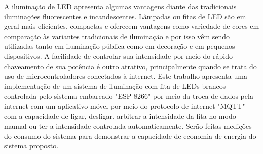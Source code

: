 

A iluminação de LED apresenta algumas vantagens diante das tradicionais iluminações fluorescentes e incandescentes. Lâmpadas ou fitas de LED são em geral mais eficientes, compactas e oferecem vantagens como variedade de cores em comparação às variantes tradicionais de iluminação e por isso vêm sendo utilizadas tanto em iluminação pública como em decoração e em pequenos dispositivos. A facilidade de controlar sua intensidade por meio do rápido chaveamento de sua potência é outro atrativo, principalmente quando se trata do uso de microcontroladores conectados à internet. Este trabalho apresenta uma implementação de um sistema de iluminação com fita de LEDs brancos controlada pelo sistema embarcado "ESP-8266" por meio da troca de dados pela internet com um aplicativo móvel por meio do protocolo de internet "MQTT" com a capacidade de ligar, desligar, arbitrar a intensidade da fita no modo manual ou ter a intensidade controlada automaticamente. Serão feitas medições do consumo do sistema para demonstrar a capacidade de economia de energia do sistema proposto.
